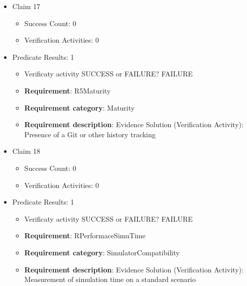 \documentclass{article}
\begin{document}
\begin{itemize}
\begin{itemize}
					\item \textbf{Requirement}: R4Verification 
					\item \textbf{Requirement category}: ModelVerification
					\item \textbf{Requirement description}: Evidence Solution (Verification Activity): Report generation with Unit Tests or Equivalent
					\end{itemize}

  				  \item Claim 17
				\begin{itemize}
			    	\item Success Count: 0 
			    	\item Verification Activities: 0
				\end{itemize}
				
									    
				\item Predicate Results: 1
					\begin{itemize}				
					\item Verificaty activity SUCCESS or FAILURE? FAILURE
					
					\item \textbf{Requirement}: R5Maturity 
					\item \textbf{Requirement category}: Maturity
					\item \textbf{Requirement description}: Evidence Solution (Verification Activity): Presence of a Git or other history tracking
					\end{itemize}

  				  \item Claim 18
				\begin{itemize}
			    	\item Success Count: 0 
			    	\item Verification Activities: 0
				\end{itemize}
				
									    
				\item Predicate Results: 1
					\begin{itemize}				
					\item Verificaty activity SUCCESS or FAILURE? FAILURE
					
					\item \textbf{Requirement}: RPerformaceSimuTime 
					\item \textbf{Requirement category}: SimulatorCompatibility
					\item \textbf{Requirement description}: Evidence Solution (Verification Activity): Measurement of simulation time on a standard scenario
					\end{itemize}


\end{itemize}
\end{document}
